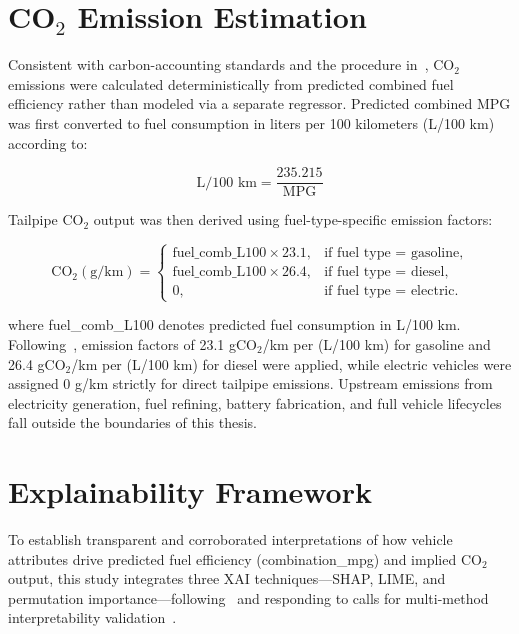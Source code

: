 \section{CO$_2$ Emission Estimation}

Consistent with carbon-accounting standards and the procedure in~\cite{atique2026explainable}, CO$_2$ emissions were calculated deterministically from predicted combined fuel efficiency rather than modeled via a separate regressor. Predicted combined MPG was first converted to fuel consumption in liters per 100 kilometers (L/100 km) according to:

\begin{equation}
\text{L/100 km}=\frac{235.215}{\text{MPG}}
\label{eq:l100km}
\end{equation}

Tailpipe CO$_2$ output was then derived using fuel-type-specific emission factors:

\begin{equation}
\mathrm{CO}_2(\mathrm{g/km})=
\begin{cases}
\text{fuel\_comb\_L100}\times23.1, & \text{if fuel type = gasoline},\\
\text{fuel\_comb\_L100}\times26.4, & \text{if fuel type = diesel},\\
0, & \text{if fuel type = electric}.
\end{cases}
\label{eq:co2}
\end{equation}

where fuel\_comb\_L100 denotes predicted fuel consumption in L/100 km. Following~\cite{atique2026explainable}, emission factors of 23.1 gCO$_2$/km per (L/100 km) for gasoline and 26.4 gCO$_2$/km per (L/100 km) for diesel were applied, while electric vehicles were assigned 0 g/km strictly for direct tailpipe emissions. Upstream emissions from electricity generation, fuel refining, battery fabrication, and full vehicle lifecycles fall outside the boundaries of this thesis.


\section{Explainability Framework}

To establish transparent and corroborated interpretations of how vehicle attributes drive predicted fuel efficiency (combination\_mpg) and implied CO$_2$ output, this study integrates three XAI techniques---SHAP, LIME, and permutation importance---following~\cite{atique2026explainable} and responding to calls for multi-method interpretability validation~\cite{ghadi2025explainable}\cite{yoo2025machine}.

